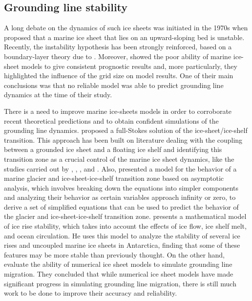 \documentclass{article}
\begin{document}
\subsection{Grounding line stability}

A long debate on the dynamics of such ice sheets was initiated in the 1970s when \cite{weertman1974stability} proposed that a marine ice sheet that lies on an upward-sloping bed is unstable. Recently, the instability hypothesis has been strongly reinforced, based on a boundary-layer theory due to \cite{schoof2007ice}. Moreover, \cite{vieli2005assessing} showed the poor ability of marine ice-sheet models to give consistent prognostic results and, more particularly, they highlighted the influence of the grid size on model results. One of their main conclusions was that no reliable model was able to predict grounding line dynamics at the time of their study.

There is a need to improve marine ice-sheets models in order to corroborate recent theoretical predictions and to obtain confident simulations of the grounding line dynamics. \cite{durand2009marine} proposed a full-Stokes solution of the ice-sheet/ice-shelf transition. This approach has been built on literature dealing with the coupling between a grounded ice sheet and a floating ice shelf and identifying this transition zone as a crucial control of the marine ice sheet dynamics, like the studies carried out by \cite{weertman1974stability}, \cite{van1985response}, \cite{schoof2007ice}, and \cite{schoof2007marine}. Also, \cite{chugunov1996modelling} presented a model for the behavior of a marine glacier and ice-sheet-ice-shelf transition zone based on asymptotic analysis, which involves breaking down the equations into simpler components and analyzing their behavior as certain variables approach infinity or zero, to derive a set of simplified equations that can be used to predict the behavior of the glacier and ice-sheet-ice-shelf transition zone. \cite{hindmarsh1996stability} presents a mathematical model of ice rise stability, which takes into account the effects of ice flow, ice shelf melt, and ocean circulation. He uses this model to analyze the stability of several ice rises and uncoupled marine ice sheets in Antarctica, finding that some of these features may be more stable than previously thought. On the other hand, \cite{vieli2005assessing} evaluate the ability of numerical ice sheet models to simulate grounding line migration. They concluded that while numerical ice sheet models have made significant progress in simulating grounding line migration, there is still much work to be done to improve their accuracy and reliability.
\end{document}
